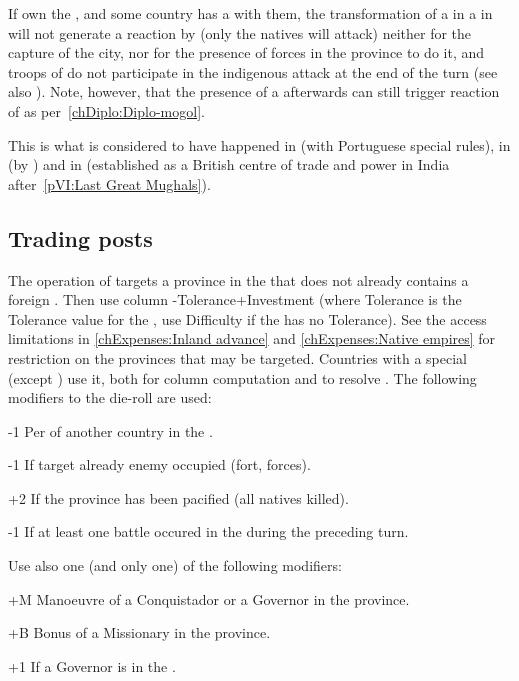 \aparag[Bengal] If \paysMogol own the , and some country
has a \dipAT with them, the transformation of a \TP in a \COL in
\villeCalcutta will not generate a reaction by  (only the natives
will attack) neither for the capture of the city, nor for the presence of
forces in the province to do it, and troops of \paysMogol do not participate
in the indigenous attack at the end of the turn (see also
).
\bparag Note, however, that the presence of a \COL afterwards can still
trigger reaction of \paysMogol as per~\ref{chDiplo:Diplo-mogol}.

\begin{designnote}
  This is what is considered to have happened in \villeGoa (with Portuguese
  special rules), in \villeJakarta (by \leaderCoen) and in \villeCalcutta
  (established as a British centre of trade and power in India
  after~\ref{pVI:Last Great Mughals}).
\end{designnote}



\subsection{Trading posts}

 The operation of 
targets a province in the \ROTW that does not already contains a foreign
\COL. Then use column \FTI-Tolerance+Investment (where Tolerance is the
Tolerance value for the \Area, use Difficulty if the \Area has no Tolerance).
\bparag See the access limitations in \ref{chExpenses:Inland advance} and
\ref{chExpenses:Native empires} for restriction on the provinces that may be
targeted.
\bparag Countries with a special \FTI (except \HIS) use it, both for column
computation and to resolve \undemi.
\bparag The following modifiers to the die-roll are used:
\begin{modlist}
\item[-1]Per \TP of another country in the \Area.
\item[-1]If target already enemy occupied (fort, forces).
\item[+2]If the province has been pacified (all natives killed).
\item[-1]If at least one battle occured in the \Area during the preceding
  turn.
\end{modlist}
\bparag Use also one (and only one) of the following modifiers:
\begin{modlist}
\item[+M]Manoeuvre of a Conquistador or a Governor in the province.
\item[+B]Bonus of a Missionary in the province.
\item[+1]If a Governor is in the \Area.
\end{modlist}

